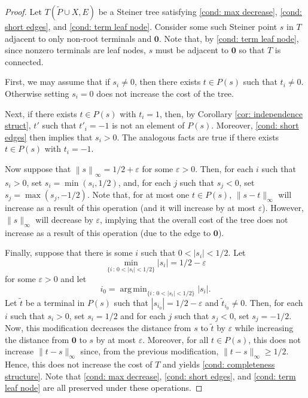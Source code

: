 \documentclass{theoretics}
\DeclareMathOperator*{\argmin}{arg\,min}
\newcommand{\1}{\textbf{1}}
\newcommand{\norm}[1]{\left\lVert#1\right\rVert}
\renewcommand{\tilde}{\widetilde}
\begin{document}
\begin{proof}
Let $T(\tilde{P} \cup X, E)$ be a Steiner tree satisfying \ref{cond: max decrease}, \ref{cond: short edges}, and \ref{cond: term leaf node}. Consider some such Steiner point $s$ in $T$ adjacent to only non-root terminals and $\mathbf{0}$. Note that, by \ref{cond: term leaf node}, since nonzero terminals are leaf nodes, $s$ must be adjacent to $\mathbf{0}$ so that $T$ is connected.

First,  we may assume that if $s_i \neq 0$, then there exists $t \in P(s)$ such that $t_i \neq 0$. Otherwise setting $s_i = 0$ does not increase the cost of the tree.

Next, if there exists $t \in P(s)$ with $t_i = 1$, then, by Corollary \ref{cor: independence struct}, $t'$ such that $t'_i = -1$ is not an element of $P(s)$. Moreover, \ref{cond: short edges} then implies that $s_i > 0$. The analogous facts are true if there exists $t \in P(s) $ with $t_i = -1$.

Now suppose that $\norm{s}_{\infty} = 1/2 + \varepsilon$ for some $\varepsilon > 0$. Then, for each $i$ such that $s_i > 0$, set $s_i = \min(s_i, 1/2)$, and, for each $j$ such that $s_j <0$, set $s_j = \max(s_j, -1/2)$. Note that, for at most one $t \in P(s)$, $\|s - t\|_{\infty}$ will increase as a result of this operation (and it will increase by at most $\varepsilon$). However, $\|s\|_{\infty}$ will decrease by $\varepsilon$, implying that the overall cost of the tree does not increase as a result of this operation (due to the edge to $\mathbf{0}$).

Finally, suppose that there is some $i$ such that $0 < |s_i| < 1/2$. Let 
\[
\min_{\{i \,:\, 0 < |s_i| < 1/2\}} |s_i| = 1/2 - \varepsilon
\]
for some $\varepsilon > 0$ and let 
\[
i_0 = \argmin_{\{i \,:\, 0 < |s_i| < 1/2\}} |s_i|.
\]
Let $\tilde{t}$ be a terminal in $P(s)$ such that $|s_{i_0}| = 1/2 - \varepsilon$ and $\tilde{t}_{i_0} \neq 0$. Then, for each $i$ such that $s_i > 0$, set $s_i = 1/2$ and for each $j$ such that $s_j < 0$, set $s_j = -1/2$. Now, this modification decreases the distance from $s$ to $\tilde{t}$ by $\varepsilon$ while increasing the distance from $\mathbf{0}$ to $s$ by at most $\varepsilon$. Moreover, for all $t \in P(s)$, this does not increase $\|t - s\|_{\infty}$ since, from the previous modification, $\|t - s\|_{\infty} \geq 1/2$. Hence, this does not increase the cost of $T$ and yields \ref{cond: completeness structure}. Note that \ref{cond: max decrease}, \ref{cond: short edges}, and \ref{cond: term leaf node} are all preserved under these operations.
\end{proof}
\end{document}
